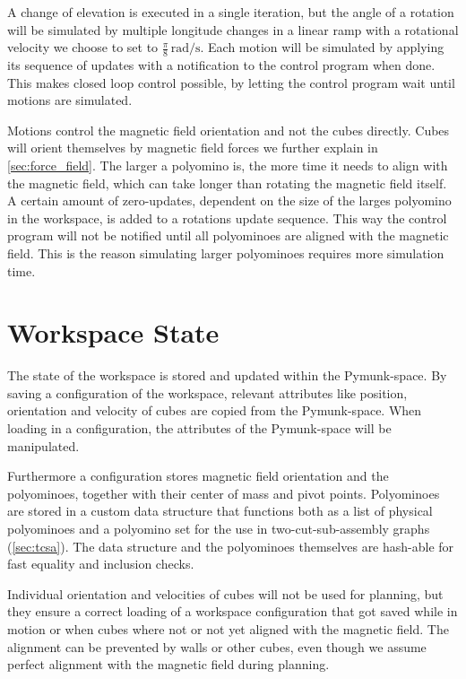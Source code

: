 A change of elevation is executed in a single iteration, but the angle of a rotation will be simulated by multiple longitude changes in a linear ramp with a rotational velocity we choose to set to $\frac{\pi}{8} \, \text{rad}/\text{s}$.
Each motion will be simulated by applying its sequence of updates with a notification to the control program when done.
This makes closed loop control possible, by letting the control program wait until motions are simulated.

Motions control the magnetic field orientation and not the cubes directly.
Cubes will orient themselves by magnetic field forces we further explain in \autoref{sec:force_field}.
The larger a polyomino is, the more time it needs to align with the magnetic field, which can take longer than rotating the magnetic field itself.
A certain amount of zero-updates, dependent on the size of the larges polyomino in the workspace, is added to a rotations update sequence.
This way the control program will not be notified until all polyominoes are aligned with the magnetic field.
This is the reason simulating larger polyominoes requires more simulation time.

\section{Workspace State}
\label{sec:workspace_state}

The state of the workspace is stored and updated within the Pymunk-space.
By saving a configuration of the workspace, relevant attributes like position, orientation and velocity of cubes are copied from the Pymunk-space.
When loading in a configuration, the attributes of the Pymunk-space will be manipulated.

Furthermore a configuration stores magnetic field orientation and the polyominoes, together with their center of mass and pivot points.
Polyominoes are stored in a custom data structure that functions both as a list of physical polyominoes and a polyomino set for the use in two-cut-sub-assembly graphs (\autoref{sec:tcsa}).
The data structure and the polyominoes themselves are hash-able for fast equality and inclusion checks.

Individual orientation and velocities of cubes will not be used for planning, but they ensure a correct loading of a workspace configuration that got saved while in motion or when cubes where not or not yet aligned with the magnetic field.
The alignment can be prevented by walls or other cubes, even though we assume perfect alignment with the magnetic field during planning.

